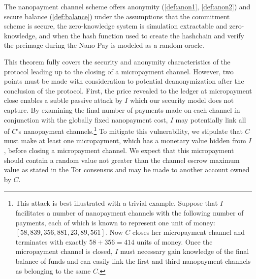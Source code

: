 \begin{theorem}
  The nanopayment channel scheme offers anonymity (\ref{def:anon1},
  \ref{def:anon2}) and secure balance (\ref{def:balance}) under the assumptions
  that the commitment scheme is secure, the zero-knowledge system is simulation
  extractable and zero-knowledge, and when the hash function used to create the
  hashchain and verify the preimage during the Nano-Pay is modeled as a random
  oracle.



\end{theorem}

This theorem fully covers the security and anonymity characteristics of the
protocol leading up to the closing of a micropayment channel. However, two
points must be made with consideration to potential deanonymization after the
conclusion of the protocol. First, the price revealed to the ledger at
micropayment close enables a subtle passive attack by $I$ which our security
model does not capture. By examining the final number of payments made on each
channel in conjunction with the globally fixed nanopayment cost, $I$ may
potentially link all of $C$'s nanopayment channels.\footnote{This attack is best
  illustrated with a trivial example. Suppose that $I$ facilitates a number of
  nanopayment channels with the following number of payments, each of which is
  known to represent one unit of money: $[58, 839, 356, 881, 23, 89, 561]$. Now
  $C$ closes her micropayment channel and terminates with exactly $58 + 356 = 414$ units
  of money. Once the micropayment channel is closed, $I$ must necessary gain
  knowledge of the final balance of funds and can easily link the first and
  third nanopayment channels as belonging to the same $C$.} To mitigate this
vulnerability, we stipulate that $C$ must make at least one micropayment, which
has a monetary value hidden from $I$, before closing a micropayment channel. We
expect that this micropayment should contain a random value not greater than the
channel escrow maximum value as stated in the Tor consensus and may be made to
another account owned by $C$.

